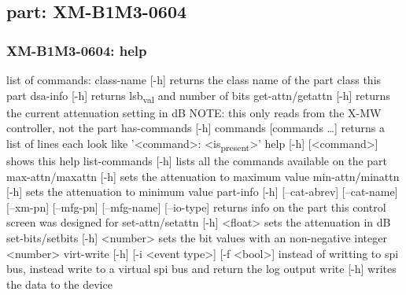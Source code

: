 \documentclass[11pt]{article}
\begin{document}
\subsection{part: XM-B1M3-0604}
\label{sec:org59d9880}
\subsubsection{XM-B1M3-0604: help}
\label{sec:org6c75b34}
list of commands:
  class-name [-h]
    returns the class name of the part class this part
  dsa-info [-h]
    returns lsb\textsubscript{val} and number of bits
  get-attn/getattn [-h]
    returns the current attenuation setting in dB
    NOTE: this only reads from the X-MW controller, not the part
  has-commands [-h] commands [commands \ldots{}]
    returns a list of lines each look like '<command>: <is\textsubscript{present}>'
  help [-h] [<command>]
    shows this help
  list-commands [-h]
    lists all the commands available on the part
  max-attn/maxattn [-h]
    sets the attenuation to maximum value
  min-attn/minattn [-h]
    sets the attenuation to minimum value
  part-info  [-h] [--cat-abrev] [--cat-name] [--xm-pn] [--mfg-pn] [--mfg-name]
          [--io-type]
    returns info on the part this control screen was designed for
  set-attn/setattn [-h] <float>
    sets the attenuation in dB
  set-bits/setbits [-h] <number>
    sets the bit values with an non-negative integer <number>
  virt-write [-h] [-i <event type>] [-f <bool>]
    instead of writting to spi bus, instead write to a virtual spi bus
    and return the log output
  write [-h]
    writes the data to the device
\end{document}
